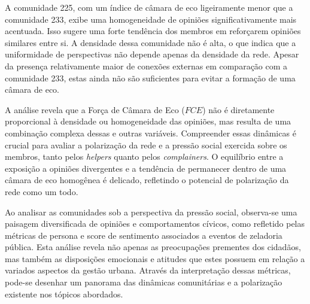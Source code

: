 A comunidade 225, com um índice de câmara de eco ligeiramente menor que a comunidade 233, exibe uma homogeneidade de opiniões significativamente mais acentuada. Isso sugere uma forte tendência dos membros em reforçarem opiniões similares entre si. A densidade dessa comunidade não é alta, o que indica que a uniformidade de perspectivas não depende apenas da densidade da rede. Apesar da presença relativamente maior de conexões externas em comparação com a comunidade 233, estas ainda não são suficientes para evitar a formação de uma câmara de eco.

A análise revela que a Força de Câmara de Eco ($FCE$) não é diretamente proporcional à densidade ou homogeneidade das opiniões, mas resulta de uma combinação complexa dessas e outras variáveis. Compreender essas dinâmicas é crucial para avaliar a polarização da rede e a pressão social exercida sobre os membros, tanto pelos \textit{helpers} quanto pelos \textit{complainers}. O equilíbrio entre a exposição a opiniões divergentes e a tendência de permanecer dentro de uma câmara de eco homogênea é delicado, refletindo o potencial de polarização da rede como um todo.

\begin{table}[ht]
	\centering
	\caption{Resumo das Métricas de Câmaras de Eco das Comunidades em Santo André}
	\label{tab:community-barometer-metrics-santo-andre}
\end{table}

Ao analisar as comunidades sob a perspectiva da pressão social, observa-se uma paisagem diversificada de opiniões e comportamentos cívicos, como refletido pelas métricas de persona e score de sentimento associados a eventos de zeladoria pública. Esta análise revela não apenas as preocupações prementes dos cidadãos, mas também as disposições emocionais e atitudes que estes possuem em relação a variados aspectos da gestão urbana. Através da interpretação dessas métricas, pode-se desenhar um panorama das dinâmicas comunitárias e a polarização existente nos tópicos abordados.

